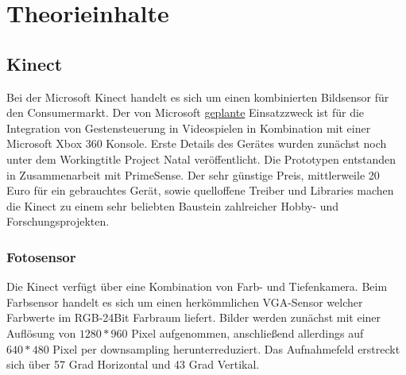 
\chapter{Theorieinhalte}
	\section{Kinect}
	Bei der Microsoft Kinect handelt es sich um einen kombinierten Bildsensor für den Consumermarkt. Der von Microsoft \underline{geplante} Einsatzzweck ist für die Integration von Gestensteuerung in Videospielen in Kombination mit einer Microsoft Xbox 360 Konsole. Erste Details des Gerätes wurden zunächst noch unter dem Workingtitle Project Natal veröffentlicht. Die Prototypen entstanden in Zusammenarbeit mit PrimeSense. Der sehr günstige Preis, mittlerweile 20 Euro für ein gebrauchtes Gerät, sowie quelloffene Treiber und Libraries machen die Kinect zu einem sehr beliebten Baustein zahlreicher Hobby- und Forschungsprojekten.
		\subsection{Fotosensor}
		Die Kinect verfügt über eine Kombination von Farb- und Tiefenkamera. Beim Farbsensor handelt es sich um einen herkömmlichen VGA-Sensor welcher Farbwerte im RGB-24Bit Farbraum liefert. Bilder werden zunächst mit einer Auflösung von $1280*960$ Pixel aufgenommen, anschließend allerdings auf $640*480$ Pixel per downsampling herunterreduziert. Das Aufnahmefeld erstreckt sich über 57 Grad Horizontal und 43 Grad Vertikal.
			\cite{kinect-georg}
